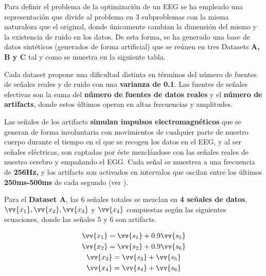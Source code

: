 Para definir el problema de la optimización de un EEG se ha empleado una representación que divide al problema en 3 subproblemas con la misma naturaleza que el original, donde únicamente cambian la dimensión del mismo y la existencia de ruido en los datos. De esta forma, se ha generado una base de datos sintéticos (generados de forma artificial)\cite{ICA-Calibrate} que se reúnen en tres Datasets \textbf{A, B y C} tal y como se muestra en la siguiente tabla.

\begin{table}[H]
	\centering
		\caption{Grupos del problema del EEG.}
		\label{tabla:gruposEEG}
\end{table}

Cada dataset propone una dificultad distinta en términos del número de fuentes de señales reales y de ruido con una \textbf{varianza de 0.1}. Las fuentes de señales efectivas son la suma del \textbf{número de fuentes de datos reales} y el \textbf{número de artifacts}, donde estos últimos operan en altas frecuencias y amplitudes. 

Las señales de los artifacts \textbf{simulan impulsos electromagnéticos} que se generan de forma involuntaria con movimientos de cualquier parte de nuestro cuerpo durante el tiempo en el que se recogen los datos en el EEG, y al ser señales eléctricas, son captadas por éste mezclándose con las señales reales de nuestro cerebro y empañando el EGG. Cada señal se muestrea a una frecuencia de \textbf{256Hz,} y los artifacts son activados en intervalos que oscilan entre los últimos \textbf{250ms-500ms} de cada segundo (ver \cite{ICA-Calibrate}).

Para el \textbf{Dataset A}, las 6 señales totales se mezclan en \textbf{4 señales de datos}, $\vv{x_1}, \vv{x_2}, \vv{x_3}$ y $ \vv{x_4} $ compuestas según las siguientes ecuaciones, donde las señales 5 y 6 son artifacts.

\begin{equation}\label{eq:D4}
	\begin{gathered}
		\vv{x_1} = \vv{s_1} + 0.9\vv{s_5}\\
		\vv{x_2} = \vv{s_2} + 0.9\vv{s_6}\\
		\vv{x_3} = \vv{s_3} + \vv{s_5}\\
		\vv{x_4} = \vv{s_4} + \vv{s_6}\\
	\end{gathered}
\end{equation}


